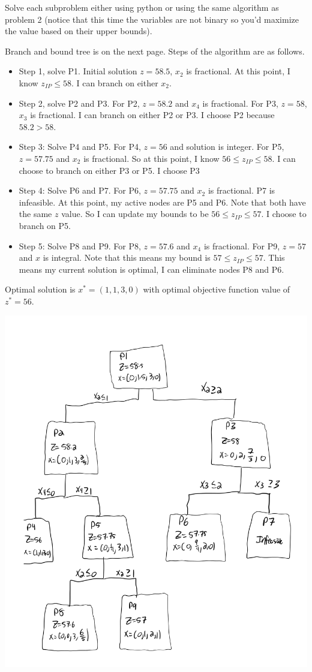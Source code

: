 \documentclass[11pt]{article}
\theoremstyle{definition}
\newcommand{\blu}{\color{blue}}
\begin{document}
\begin{enumerate}
Solve each subproblem either using python or using the same algorithm as problem 2 (notice that this time the variables are not binary so you'd maximize the value based on their upper bounds).

{\blu
Branch and bound tree is on the next page. Steps of the algorithm are as follows.

\begin{itemize}
\item Step 1, solve P1. Initial solution $z = 58.5$, $x_2$ is fractional. At this point, I know $z_{IP} \leq 58$. I can branch on either $x_2$.
\item Step 2, solve P2 and P3. For P2, $z = 58.2$ and $x_4$ is fractional. For P3, $z = 58$, $x_3$ is fractional. I can branch on either P2 or P3. I choose P2 because $58.2 > 58$.
\item Step 3: Solve P4 and P5. For P4, $z = 56$ and solution is integer. For P5, $ z = 57.75$ and $x_2$ is fractional. So at this point, I know $56 \leq z_{IP} \leq 58$. I can choose to branch on either P3 or P5. I choose P3
\item Step 4: Solve P6 and P7. For P6, $z = 57.75$ and $x_2$ is fractional. P7 is infeasible. At this point, my active nodes are P5 and P6. Note that both have the same $z$ value. So I can update my bounds to be $56 \leq z_{IP} \leq 57$. I choose to branch on P5.
\item Step 5: Solve P8 and P9. For P8, $z = 57.6$ and $x_4$ is fractional. For P9, $z = 57$ and $x$ is integral. Note that this means my bound is $57 \leq z_{IP} \leq 57$. This means my current solution is optimal, I can eliminate nodes P8 and P6.
\end{itemize}

Optimal solution is $x^* = (1,1,3,0)$ with optimal objective function value of $z^* = 56$.


\newpage
\includegraphics[width=\textwidth]{Prob3-Tree.png}
}

\end{enumerate}
\end{document}
